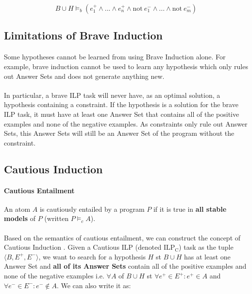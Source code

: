 \documentclass{article}
\theoremstyle{plain}
\theoremstyle{definition}
\begin{document}
\begin{multicols}{2}
$$B \cup H \models_b (e_1^+ \land ... \land e_n^+ \land \text{not}\ e_1^- \land ...  \land \text{not}\ e_m^-)$$

\subsection{Limitations of Brave Induction}\label{sec:BraveInductionLimitations}

\paragraph{} Some hypotheses cannot be learned from using Brave Induction alone. For example, brave induction cannot be used to learn any hypothesis which only rules out Answer Sets and does not generate anything new.

\paragraph{} In particular, a brave ILP task will never have, as an optimal solution, a hypothesis containing a constraint. If the hypothesis is a solution for the brave ILP task, it must have at least one Answer Set that contains all of the positive examples and none of the negative examples. As constraints only rule out Answer Sets, this Answer Sets will still be an Answer Set of the program without the constraint.

\subsection{Cautious Induction}
\paragraph{Cautious Entailment} An atom $A$ is cautiously entailed by a program $P$ if it is true in \textbf{all stable models} of $P$ (written $P \models_c A$).

\paragraph{} Based on the semantics of cautious entailment, we can construct the concept of Cautious Induction  \cite{sakama08}. Given a Cautious ILP (denoted $\text{ILP}_\text{C}$) task as the tuple $\langle B, E^+, E^- \rangle$, we want to search for a hypothesis $H$ st $B \cup H$ has at least one Answer Set and \textbf{all of its Answer Sets} contain all of the positive examples and none of the negative examples i.e. $\forall A$ of $B \cup H$ st $\forall e^+ \in E^+: e^+ \in A$ and $\forall e^- \in E^-: e^- \not\in A$. We can also write it as:


\end{multicols}
\end{document}
